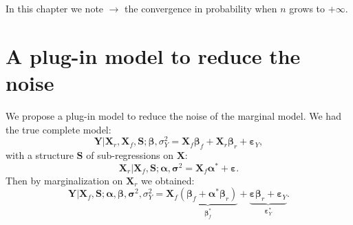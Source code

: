 \documentclass[12pt,a4paper]{report}
\begin{document}
		In this chapter we note $\longrightarrow$ the convergence in probability when $n$ grows to $+\infty$.
		\newpage
\section{A plug-in model  to reduce the noise}	
	We propose a plug-in model to reduce the noise of the marginal model.
	We had the true complete model:
\begin{equation}
		\boldsymbol{Y}|\boldsymbol{X}_r,\boldsymbol{X}_f,\boldsymbol{S};\boldsymbol{\beta},\sigma_Y^2= \boldsymbol{X}_f\boldsymbol{\beta}_f+\boldsymbol{X}_r\boldsymbol{\beta}_r+\boldsymbol{\varepsilon}_Y, \nonumber 
\end{equation}		
	with a structure $\boldsymbol{S}$ of sub-regressions on $\boldsymbol{X}$:
	\begin{equation}
		\boldsymbol{X}_r 
		|\boldsymbol{X}_f,\boldsymbol{S};\boldsymbol{\alpha},\boldsymbol{\sigma}^2
		=\boldsymbol{X}_f\boldsymbol{\alpha}^*+\boldsymbol{\varepsilon}. \label{ssregplugin}
	\end{equation}
Then by marginalization on $\boldsymbol{X}_r$ we obtained:
		\begin{equation}
		\boldsymbol{Y}|\boldsymbol{X}_f,\boldsymbol{S};\boldsymbol{\alpha},\boldsymbol{\beta},\boldsymbol{\sigma}^2,\sigma_Y^2= \boldsymbol{X}_f\underbrace{(\boldsymbol{\beta}_f+\boldsymbol{\alpha}^*\boldsymbol{\beta}_r)}_{\boldsymbol{\beta}^*_f}+\underbrace{\boldsymbol{\varepsilon}\boldsymbol{\beta}_r+\boldsymbol{\varepsilon}_Y}_{\boldsymbol{\varepsilon}_Y^*}.  \label{pluginorig}
		\end{equation}
\end{document}
